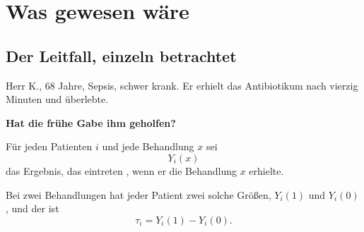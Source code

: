 \chapter{Was gewesen wäre}

\section{Der Leitfall, einzeln betrachtet}

\begin{merksatz}
Herr K., $68$ Jahre, Sepsis, schwer krank. Er erhielt das Antibiotikum nach vierzig Minuten und überlebte.

\begin{center}
\begin{minipage}{0.9\textwidth}
\textbf{Hat die frühe Gabe ihm geholfen?}
\end{minipage}
\end{center}

\begin{center}
\begin{minipage}{0.88\textwidth}
\end{minipage}
\end{center}
\end{merksatz}

\begin{definition}
Für jeden Patienten $i$ und jede Behandlung $x$ sei
\[ Y_i(x) \]
das Ergebnis, das eintreten , wenn er die Behandlung $x$ erhielte.

Bei zwei Behandlungen hat jeder Patient zwei solche Größen, $Y_i(1)$ und $Y_i(0)$, und der  ist
\[ \tau_i = Y_i(1) - Y_i(0) . \]
\end{definition}

